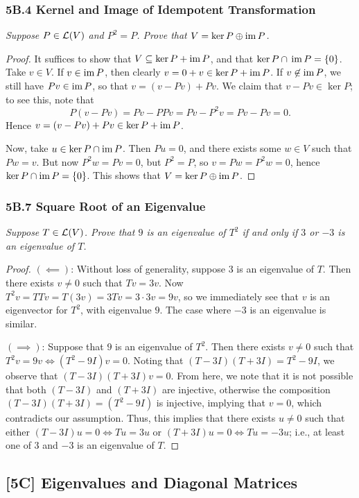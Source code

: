 \documentclass{article}
\begin{document}
\subsubsection*{5B.4 Kernel and Image of Idempotent Transformation}
\textit{Suppose $P\in\mathcal L(V)$ and $P^2 = P$. Prove that $V = \ker P\oplus \operatorname{im} P$.}
\begin{proof}
It suffices to show that $V \subseteq \ker P+\operatorname{im} P$, and that $\ker P\cap\, \operatorname{im} P = \{0\}$. Take $v\in V$. If $v\in \operatorname{im} P$, then clearly $v = 0 + v \in \ker P +\operatorname{im} P$. If $v\not\in\operatorname{im} P$, we still have $Pv \in \operatorname{im} P$, so that $v = (v - Pv) + Pv$. We claim that $v-Pv\in\ker P$; to see this, note that
$$P(v-Pv) = Pv - PPv = Pv - P^2v = Pv - Pv = 0.$$
Hence $v = (v-Pv)+Pv \in \ker P + \operatorname{im} P$.

Now, take $u\in \ker P\cap \operatorname{im} P$. Then $Pu = 0$, and there exists some $w\in V$ such that $Pw = v$. But now $P^2w = Pv = 0$, but $P^2 = P$, so $v = Pw = P^2w = 0$, hence $\ker P\cap \operatorname{im} P = \{0\}$. This shows that $V = \ker P\oplus\operatorname{im} P$.
\end{proof}

\subsubsection*{5B.7 Square Root of an Eigenvalue}
\textit{Suppose $T\in\mathcal L(V)$. Prove that $9$ is an eigenvalue of $T^2$ if and only if $3$ or $-3$ is an eigenvalue of $T$.}
\begin{proof}
$(\impliedby)$: Without loss of generality, suppose $3$ is an eigenvalue of $T$. Then there exists $v\neq 0$ such that $Tv = 3v$. Now $T^2v = TTv = T(3v) = 3Tv = 3\cdot 3v = 9v$, so we immediately see that $v$ is an eigenvector for $T^2$, with eigenvalue $9$. The case where $-3$ is an eigenvalue is similar.

$(\implies)$: Suppose that $9$ is an eigenvalue of $T^2$. Then there exists $v\neq 0$ such that $T^2v = 9v \iff (T^2 - 9I)v = 0$. Noting that $(T-3I)(T+3I) = T^2-9I$, we observe that $(T-3I)(T+3I)v = 0$. From here, we note that it is not possible that both $(T-3I)$ and $(T+3I)$ are injective, otherwise the composition $(T-3I)(T+3I) = (T^2-9I)$ is injective, implying that $v= 0$, which contradicts our assumption. Thus, this implies that there exists $u\neq 0$ such that either $(T-3I)u = 0\iff Tu = 3u$ or $(T+3I)u = 0\iff Tu = -3u$; i.e., at least one of $3$ and $-3$ is an eigenvalue of $T$.
\end{proof}
\newpage
\subsection*{[5C] Eigenvalues and Diagonal Matrices}
\end{document}
